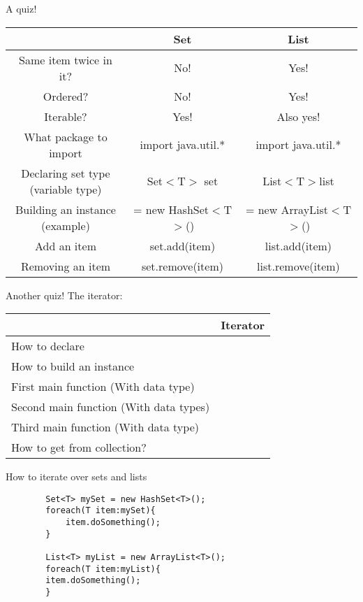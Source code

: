 \begin{frame}{A quiz!}
	\begin{tabular}{c|c|c}
		&Set&List\\
		\hline
		Same item twice in it? &No!&Yes!\\
		\hline
		Ordered?&No!&Yes!\\
		\hline
		Iterable?&Yes!&Also yes!\\
		\hline
		What package to import &import java.util.*&import java.util.*\\
		\hline
		Declaring set type (variable type)&Set$<$T$>$ set&List$<$T$> $list\\
		\hline
		Building an instance (example)&= new HashSet$<$T$>$()& = new ArrayList$<$T$>$()\\
		\hline
		Add an item&set.add(item)&list.add(item)\\
		\hline
		Removing an item&set.remove(item)&list.remove(item)\\
	\end{tabular}
\end{frame}

\begin{frame}{Another quiz!}
	The iterator:\\
	\vspace{1cm}
	\begin{tabular}{l|l}
		&Iterator\\
		\hline
		How to declare&\\
		\hline
		How to build an instance&\\
		\hline
		First main function (With data type)&\\
		\hline
		Second main function (With data types)&\\
		\hline
		Third main function (With data type)&\\
		\hline
		How to get from collection?&\\
		
	\end{tabular}
\end{frame}

\begin{frame}[fragile]{How to iterate over sets and lists}
	\pause
	\begin{lstlisting}
		Set<T> mySet = new HashSet<T>();
		foreach(T item:mySet){
			item.doSomething();
		}
		
		List<T> myList = new ArrayList<T>();
		foreach(T item:myList){
		item.doSomething();
		}
	\end{lstlisting}
\end{frame}

